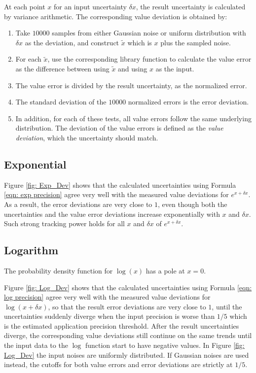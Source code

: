 \documentclass[twoside]{article}
\numberwithin{equation}{section}
\begin{document}
At each point $x$ for an input uncertainty $\delta x$, the result uncertainty is calculated by variance arithmetic.
The corresponding value deviation is obtained by:
\begin{enumerate}

\item Take $10000$ samples from either Gaussian noise or uniform distribution with $\delta x$ as the deviation, and construct $\tilde{x}$ which is $x$ plus the sampled noise.  

\item For each $\tilde{x}$, use the corresponding library function to calculate the value error as the difference between using $\tilde{x}$ and using $x$ as the input.

\item The value error is divided by the result uncertainty, as the normalized error.

\item The standard deviation of the $10000$ normalized errors is the error deviation.

\item In addition, for each of these tests, all value errors follow the same underlying distribution.
The deviation of the value errors is defined as the \emph{value deviation}, which the uncertainty should match.

\end{enumerate}

\subsection{Exponential}

Figure \ref{fig: Exp_Dev} shows that the calculated uncertainties using Formula \eqref{eqn: exp precision} agree very well with the measured value deviations for $e^{x + \delta x}$.
As a result, the error deviations are very close to $1$, even though both the uncertainties and the value error deviations increase exponentially with $x$ and $\delta x$.
Such strong tracking power holds for all $x$ and $\delta x$ of $e^{x + \delta x}$. 

\subsection{Logarithm}

The probability density function for $\log(x)$ has a pole at $x=0$.

Figure \ref{fig: Log_Dev} shows that the calculated uncertainties using Formula \eqref{eqn: log precision} agree very well with the measured value deviations for $\log(x + \delta x)$, so that the result error deviations are very close to $1$, until the uncertainties suddenly diverge when the input precision is worse than $1/5$ which is the estimated application precision threshold.
After the result uncertainties diverge, the corresponding value deviations still continue on the same trends until the input data to the $\log$ function start to have negative values.
In Figure \ref{fig: Log_Dev} the input noises are uniformly distributed.
If Gaussian noises are used instead, the cutoffs for both value errors and error deviations are strictly at $1/5$.
\end{document}
